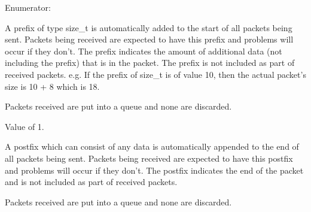 \begin{Desc}
\item[Enumerator: ]\par
\begin{description}
\item[{\em 
\hypertarget{class_net_mode_a43cfa55ee6a4db66a8d7d6c27f766964a5fc5653d3c2a1e1b5a4306e7060b41c9}{
TCP\_\-PREFIX\_\-SIZE}
\label{class_net_mode_a43cfa55ee6a4db66a8d7d6c27f766964a5fc5653d3c2a1e1b5a4306e7060b41c9}
}]A prefix of type size\_\-t is automatically added to the start of all packets being sent. Packets being received are expected to have this prefix and problems will occur if they don't. The prefix indicates the amount of additional data (not including the prefix) that is in the packet. The prefix is not included as part of received packets. e.g. If the prefix of size\_\-t is of value 10, then the actual packet's size is 10 + 8 which is 18. \par
\par


Packets received are put into a queue and none are discarded.\par
\par


Value of 1. \item[{\em 
\hypertarget{class_net_mode_a43cfa55ee6a4db66a8d7d6c27f766964abe08876125a416186e74c901f6d29ce4}{
TCP\_\-POSTFIX}
\label{class_net_mode_a43cfa55ee6a4db66a8d7d6c27f766964abe08876125a416186e74c901f6d29ce4}
}]A postfix which can consist of any data is automatically appended to the end of all packets being sent. Packets being received are expected to have this postfix and problems will occur if they don't. The postfix indicates the end of the packet and is not included as part of received packets.\par
\par


Packets received are put into a queue and none are discarded.\par
\par



\end{description}
\end{Desc}
